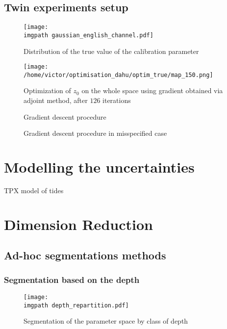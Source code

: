 \documentclass[../../Main_ManuscritThese.tex]{subfiles}
\newcommand\imgpath{/home/victor/acadwriting/Manuscrit/Text/Chapter5/img/}
\begin{document}
\subsection{Twin experiments setup}
\begin{figure}[ht]
  \centering
  \texttt{[image: \\imgpath gaussian\_english\_channel.pdf]}
  \caption{\label{fig:gaussian_zob} Distribution of the true value of the calibration parameter}
\end{figure}


 \begin{figure}[ht]
  \centering
  \texttt{[image: /home/victor/optimisation\_dahu/optim\_true/map\_150.png]}
  \caption{\label{fig:optimization_map_126} Optimization of $z_0$ on the whole space using gradient obtained via adjoint method, after $126$ iterations}
\end{figure}

 \begin{figure}[ht]
  \centering
  
  \caption{\label{fig:ctrl_true} Gradient descent procedure}
\end{figure}

 \begin{figure}[ht]
  \centering
  
  \caption{\label{fig:ctrl_0_001} Gradient descent procedure in misspecified case}
\end{figure}


\section{Modelling the uncertainties}
\cite{egbert_efficient_2002} TPX model of tides
\section{Dimension Reduction}

\subsection{Ad-hoc segmentations methods}

\subsubsection{Segmentation based on the depth}

\cite{boutet_estimation_2015}
\begin{figure}[ht]
  \centering
  \texttt{[image: \\imgpath depth\_repartition.pdf]}
  \caption{\label{fig:depth_repartition} Segmentation of the parameter space by class of depth}
\end{figure}
\end{document}
